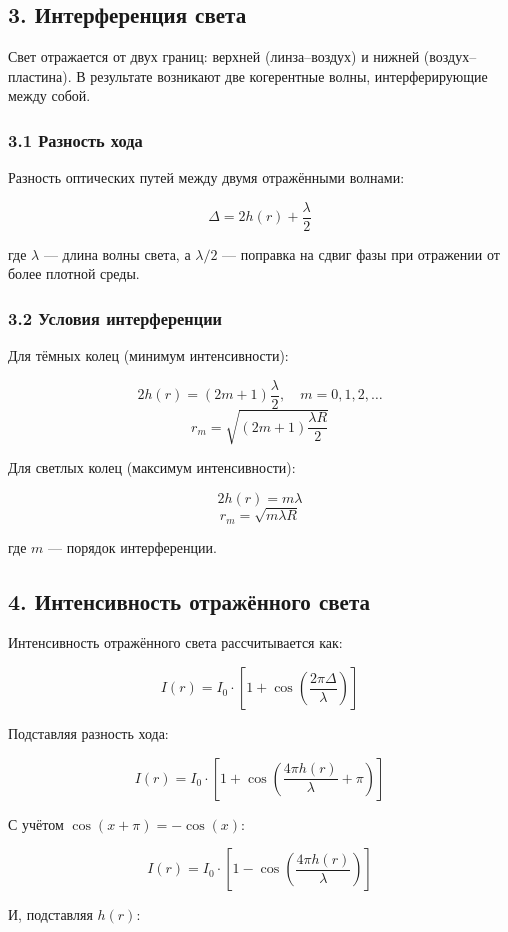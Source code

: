 \documentclass[a4paper,11pt]{article}
\theoremstyle{definition}
\begin{document}
\subsection*{3. Интерференция света}
Свет отражается от двух границ: верхней (линза–воздух) и нижней (воздух–пластина). 
В результате возникают две когерентные волны, интерферирующие между собой.



\subsubsection*{3.1 Разность хода}
Разность оптических путей между двумя отражёнными волнами:

\[
\Delta = 2h(r) + \frac{\lambda}{2}
\]

где \( \lambda \) — длина волны света, а \( \lambda/2 \) — поправка на сдвиг фазы при отражении от более плотной среды.

\subsubsection*{3.2 Условия интерференции}

Для тёмных колец (минимум интенсивности):

\[
2h(r) = (2m + 1)\frac{\lambda}{2}, \quad m = 0, 1, 2, \dots
\]
\[
r_m = \sqrt{(2m + 1)\frac{\lambda R}{2}}
\]

Для светлых колец (максимум интенсивности):

\[
2h(r) = m \lambda
\]
\[
r_m = \sqrt{m \lambda R}
\]

где \( m \) — порядок интерференции.



\subsection*{4. Интенсивность отражённого света}
Интенсивность отражённого света рассчитывается как:

\[
I(r) = I_0 \cdot \left[1 + \cos\left(\frac{2\pi \Delta}{\lambda} \right)\right]
\]

Подставляя разность хода:

\[
I(r) = I_0 \cdot \left[1 + \cos\left(\frac{4\pi h(r)}{\lambda} + \pi \right)\right]
\]

С учётом \( \cos(x + \pi) = -\cos(x) \):

\[
I(r) = I_0 \cdot \left[1 - \cos\left(\frac{4\pi h(r)}{\lambda} \right)\right]
\]

И, подставляя \( h(r) \):
\end{document}
